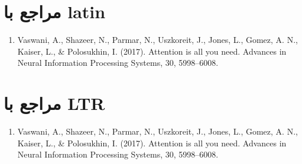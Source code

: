 \documentclass[12pt,a4paper]{report}
\begin{document}
\chapter*{مراجع با latin}
\begin{latin}
\begin{enumerate}
    \item Vaswani, A., Shazeer, N., Parmar, N., Uszkoreit, J., Jones, L., Gomez, A. N., Kaiser, L., \& Polosukhin, I. (2017). Attention is all you need. Advances in Neural Information Processing Systems, 30, 5998--6008.
\end{enumerate}
\end{latin}

\newpage
\chapter*{مراجع با LTR}
\begin{LTR}
\begin{enumerate}
    \item Vaswani, A., Shazeer, N., Parmar, N., Uszkoreit, J., Jones, L., Gomez, A. N., Kaiser, L., \& Polosukhin, I. (2017). Attention is all you need. Advances in Neural Information Processing Systems, 30, 5998--6008.
\end{enumerate}
\end{LTR}
\end{document}
